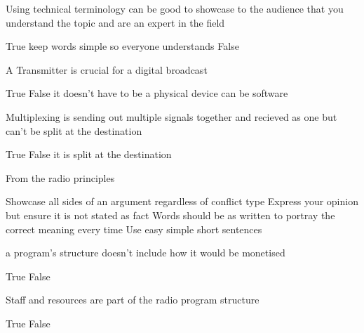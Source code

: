 \documentclass[theme=sleek, randomorder, hidesidemenu]{webquiz}
\begin{document}
\begin{question}
  Using technical terminology can be good to showcase to the audience that you understand the topic and are an expert in the field
  \begin{choice}
    \incorrect True \feedback keep words simple so everyone understands
    \correct False
  \end{choice}
\end{question}

\begin{question}
  A Transmitter is crucial for a digital broadcast
  \begin{choice}
    \correct True
    \incorrect False
    \feedback it doesn't have to be a physical device can be software
  \end{choice}
\end{question}

\begin{question}
  Multiplexing is sending out multiple signals together and recieved as one but can't be split at the destination
  \begin{choice}
    \incorrect True
    \correct False \feedback it is split at the destination
  \end{choice}

\end{question}

\begin{question}
  From the radio principles
  \begin{choice}[multiple]
    \correct Showcase all sides of an argument regardless of conflict type
    \incorrect Express your opinion but ensure it is not stated as fact
    \incorrect Words should be as written to portray the correct meaning every time
    \correct Use easy simple short sentences

  \end{choice}
\end{question}

\begin{question}
  a program's structure doesn't include how it would be monetised

  \begin{choice}
    \incorrect True
    \correct False
  \end{choice}

\end{question}

\begin{question}
  Staff and resources are part of the radio program structure

  \begin{choice}
    \correct True
    \incorrect False
  \end{choice}

\end{question}
\end{document}
